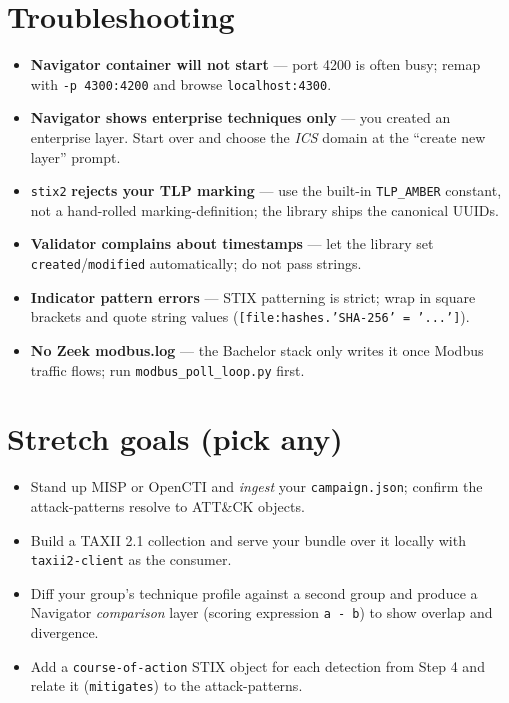 \documentclass[11pt,a4paper]{article}
\begin{document}
\section*{Troubleshooting}

\begin{notebox}
\begin{itemize}\setlength{\itemsep}{1pt}
  \item \textbf{Navigator container will not start} --- port 4200 is often busy;
        remap with \texttt{-p 4300:4200} and browse \texttt{localhost:4300}.
  \item \textbf{Navigator shows enterprise techniques only} --- you created an
        enterprise layer. Start over and choose the \emph{ICS} domain at the
        ``create new layer'' prompt.
  \item \texttt{stix2} \textbf{rejects your TLP marking} --- use the built-in
        \texttt{TLP\_AMBER} constant, not a hand-rolled marking-definition; the
        library ships the canonical UUIDs.
  \item \textbf{Validator complains about timestamps} --- let the library set
        \texttt{created}/\texttt{modified} automatically; do not pass strings.
  \item \textbf{Indicator pattern errors} --- STIX patterning is strict; wrap in
        square brackets and quote string values
        (\texttt{[file:hashes.'SHA-256' = '...']}).
  \item \textbf{No Zeek modbus.log} --- the Bachelor stack only writes it once
        Modbus traffic flows; run \texttt{modbus\_poll\_loop.py} first.
\end{itemize}
\end{notebox}

\section*{Stretch goals (pick any)}

\begin{itemize}\setlength{\itemsep}{1pt}
  \item Stand up MISP or OpenCTI and \emph{ingest} your \texttt{campaign.json};
        confirm the attack-patterns resolve to ATT\&CK objects.
  \item Build a TAXII 2.1 collection and serve your bundle over it locally with
        \texttt{taxii2-client} as the consumer.
  \item Diff your group's technique profile against a second group and produce a
        Navigator \emph{comparison} layer (scoring expression
        \texttt{a - b}) to show overlap and divergence.
  \item Add a \texttt{course-of-action} STIX object for each detection from
        Step 4 and relate it (\texttt{mitigates}) to the attack-patterns.
\end{itemize}
\end{document}
